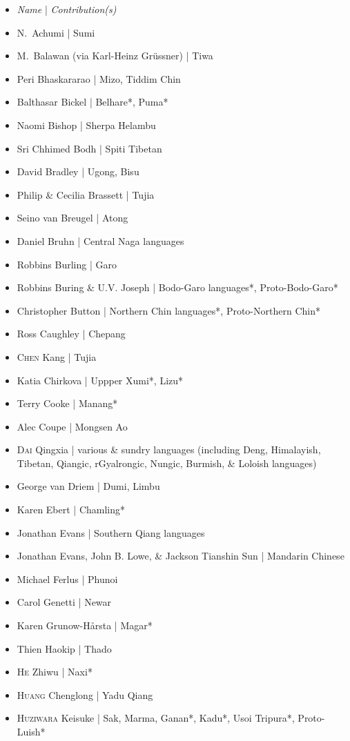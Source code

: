 \begin{itemize}
\item \textit{Name} | \textit{Contribution(s)}
\item N.\ Achumi | Sumi
\item M.\ Balawan (via Karl-Heinz Grüssner) | Tiwa
\item Peri Bhaskararao | Mizo, Tiddim Chin
\item Balthasar Bickel | Belhare*, Puma*
\item Naomi Bishop | Sherpa Helambu
\item Sri Chhimed Bodh | Spiti Tibetan
\item David Bradley | Ugong, Bisu
\item Philip \& Cecilia Brassett | Tujia
\item Seino van Breugel | Atong
\item Daniel Bruhn | Central Naga languages
\item Robbins Burling | Garo
\item Robbins Buring \& U.V. Joseph | Bodo-Garo languages*, Proto-Bodo-Garo*
\item Christopher Button | Northern Chin languages*, Proto-Northern Chin*
\item Ross Caughley | Chepang
\item \textsc{Chen} Kang | Tujia
\item Katia Chirkova | Uppper Xumi*, Lizu*
\item Terry Cooke | Manang*
\item Alec Coupe | Mongsen Ao
\item \textsc{Dai} Qingxia | various \& sundry languages (including Deng, Himalayish, Tibetan, Qiangic, rGyalrongic, Nungic, Burmish, \& Loloish languages)
\item George van Driem | Dumi, Limbu
\item Karen Ebert | Chamling*
\item Jonathan Evans | Southern Qiang languages
\item Jonathan Evans, John B. Lowe, \& Jackson Tianshin Sun | Mandarin Chinese
\item Michael Ferlus | Phunoi
\item Carol Genetti | Newar
\item Karen Grunow-Hårsta | Magar*
\item Thien Haokip | Thado
\item \textsc{He} Zhiwu | Naxi*
\item \textsc{Huang} Chenglong | Yadu Qiang
\item \textsc{Huziwara} Keisuke | Sak, Marma, Ganan*, Kadu*, Usoi Tripura*, Proto-Luish*

\end{itemize}
